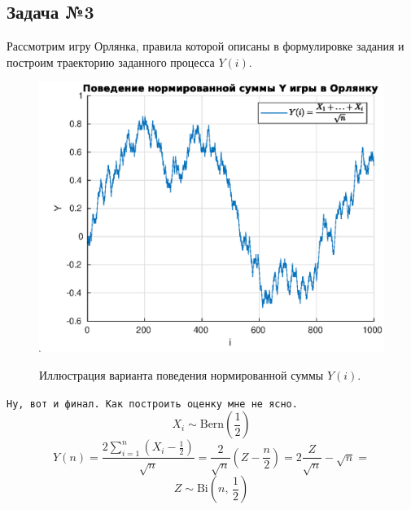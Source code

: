 \subsection{Задача №3}

Рассмотрим игру Орлянка, правила которой описаны в формулировке задания и построим траекторию заданного процесса $Y(i)$.
\begin{figure}[h]
        \noindent
        \centering
        {
                \includegraphics[width=120mm]{task_01/orl.eps}
        }
        \caption{Иллюстрация варианта поведения нормированной суммы $Y(i)$.}
\end{figure}

\texttt{Ну, вот и финал. Как построить оценку мне не ясно.}
$$
        X_i \sim \mbox{Bern}\left(\frac12\right)
$$
$$
        Y(n) = \frac{2\sum_{i=1}^{n}(X_i - \frac{1}{2})}{\sqrt{n}} =
        \frac{2}{\sqrt{n}}\left(Z - \frac{n}{2}\right) =
        2\frac{Z}{\sqrt{n}} - \sqrt{n} =
$$
$$
        Z \sim \mbox{Bi}\left(n,\,\frac12\right)
$$